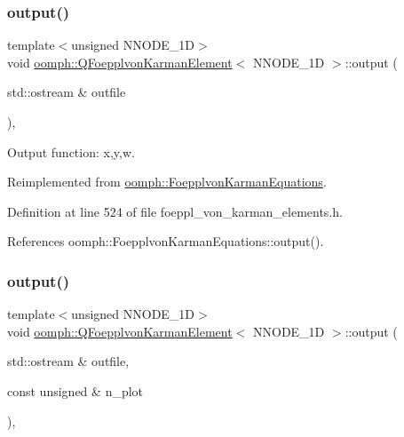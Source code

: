 \subsubsection{\texorpdfstring{output()}{output()}\hspace{0.1cm}{\footnotesize\ttfamily [1/4]}}
{\footnotesize\ttfamily template$<$unsigned N\+N\+O\+D\+E\+\_\+1D$>$ \\
void \hyperlink{classoomph_1_1QFoepplvonKarmanElement}{oomph\+::\+Q\+Foepplvon\+Karman\+Element}$<$ N\+N\+O\+D\+E\+\_\+1D $>$\+::output (\begin{DoxyParamCaption}\item[{std\+::ostream \&}]{outfile }\end{DoxyParamCaption})\hspace{0.3cm}{\ttfamily [inline]}, {\ttfamily [virtual]}}



Output function\+: x,y,w. 



Reimplemented from \hyperlink{classoomph_1_1FoepplvonKarmanEquations_a44739d9c804206ea60671b0de07ad154}{oomph\+::\+Foepplvon\+Karman\+Equations}.



Definition at line 524 of file foeppl\+\_\+von\+\_\+karman\+\_\+elements.\+h.



References oomph\+::\+Foepplvon\+Karman\+Equations\+::output().

\mbox{\label{classoomph_1_1QFoepplvonKarmanElement_a7cf9bdcf7294233f27d8fc6c87ac7bbe}} 
\subsubsection{\texorpdfstring{output()}{output()}\hspace{0.1cm}{\footnotesize\ttfamily [2/4]}}
{\footnotesize\ttfamily template$<$unsigned N\+N\+O\+D\+E\+\_\+1D$>$ \\
void \hyperlink{classoomph_1_1QFoepplvonKarmanElement}{oomph\+::\+Q\+Foepplvon\+Karman\+Element}$<$ N\+N\+O\+D\+E\+\_\+1D $>$\+::output (\begin{DoxyParamCaption}\item[{std\+::ostream \&}]{outfile,  }\item[{const unsigned \&}]{n\+\_\+plot }\end{DoxyParamCaption})\hspace{0.3cm}{\ttfamily [inline]}, {\ttfamily [virtual]}}



